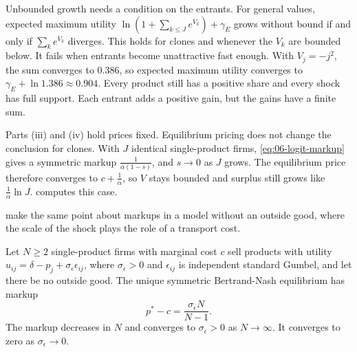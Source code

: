 Unbounded growth needs a condition on the entrants. For general values, expected maximum utility
$\ln(1 + \sum_{k \le J} e^{V_k}) + \gamma_E$ grows without bound if and only if $\sum_k e^{V_k}$ diverges. This holds
for clones and whenever the $V_k$ are bounded below. It fails when entrants become unattractive fast enough. With
$V_j = -j^2$, the sum converges to $0.386$, so expected maximum utility converges to $\gamma_E + \ln 1.386 \approx
0.904$. Every product still has a positive share and every shock has full support. Each entrant adds a positive gain,
but the gains have a finite sum.

Parts (iii) and (iv) hold prices fixed. Equilibrium pricing does not change the conclusion for clones. With $J$ identical
single-product firms, \eqref{eq:06-logit-markup} gives a symmetric markup $\frac{1}{\alpha(1-s)}$, and $s \to 0$ as $J$
grows. The equilibrium price therefore converges to $c + \frac{1}{\alpha}$, so $V$ stays bounded and surplus still grows
like $\frac{1}{\alpha}\ln J$.  computes this case.

\citet{AndersonDePalmaThisse1992} make the same point about markups in a model without an outside good, where the
scale of the shock plays the role of a transport cost.

\begin{proposition}\label{prop:06-logit-symmetric}
Let $N \ge 2$ single-product firms with marginal cost $c$ sell products with utility $u_{ij} = \delta - p_j +
\sigma_\epsilon \epsilon_{ij}$, where $\sigma_\epsilon > 0$ and $\epsilon_{ij}$ is independent standard Gumbel, and let
there be no outside good. The unique symmetric Bertrand-Nash equilibrium has markup
\begin{equation}\label{eq:06-adpt-markup}
  p^* - c = \frac{\sigma_\epsilon N}{N - 1}.
\end{equation}
The markup decreases in $N$ and converges to $\sigma_\epsilon > 0$ as $N \to \infty$. It converges to zero as
$\sigma_\epsilon \to 0$.
\end{proposition}

